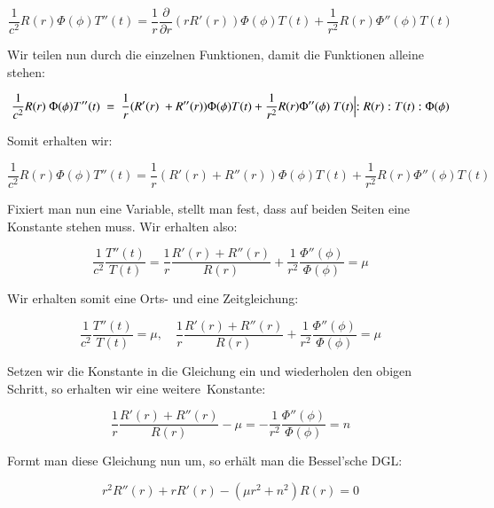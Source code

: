 \begin{equation}
\frac{1}{c^2} R(r) \Phi(\phi) T''(t) = \frac{1}{r} \frac{\partial}{\partial r}(r R'(r)) \Phi(\phi) T(t) + \frac{1}{r^2} R(r) \Phi''(\phi) T(t)
\end{equation}

Wir teilen nun durch die einzelnen Funktionen, damit die Funktionen alleine stehen:

\begin{equation}
\frac{1}{c^2} R(r) \Phi(\phi) T''(t) = \frac{1}{r}(R'(r) + R''(r)) \Phi(\phi) T(t) + \frac{1}{r^2} R(r) \Phi''(\phi) T(t)
\Bigl\lvert
:R(r) : T(t) :\Phi(\phi)
\end{equation}

Somit erhalten wir:

\begin{equation}
\frac{1}{c^2} R(r) \Phi(\phi) T''(t) = \frac{1}{r} (R'(r) + R''(r)) \Phi(\phi) T(t) + \frac{1}{r^2} R(r) \Phi''(\phi) T(t)
\end{equation}

Fixiert man nun eine Variable, stellt man fest, dass auf beiden Seiten eine Konstante stehen muss. Wir erhalten also:

\begin{equation}
\frac{1}{c^2}
\frac{T''(t)}{T(t)} = 
\frac{1}{r} 
\frac{R'(r) + R''(r)}{R(r)} + 
\frac{1}{r^2}
\frac{\Phi''(\phi)}{\Phi(\phi)} = \mu
\end{equation}

Wir erhalten somit eine Orts- und eine Zeitgleichung:

\begin{equation}
\frac{1}{c^2} 
\frac{T''(t)}{T(t)} = 
\mu
,\quad
\frac{1}{r} \frac{R'(r) + R''(r)}{R(r)} + 
\frac{1}{r^2} \frac{\Phi''(\phi)}{\Phi(\phi)} = 
\mu
\end{equation}

Setzen wir die Konstante in die Gleichung ein und wiederholen den obigen Schritt, so erhalten wir eine weitere Konstante:

\begin{equation}
\frac{1}{r} \frac{R'(r) + R''(r)}{R(r)} - \mu =
-\frac{1}{r^2} \frac{\Phi''(\phi)}{\Phi(\phi)} = n
\end{equation}

Formt man diese Gleichung nun um, so erhält man die Bessel'sche DGL:

\begin{equation}
r^2 R''(r) + r R'(r) - (\mu r^2 + n^2)R(r) = 0
\label{eq:besselsche_dgl}
\end{equation}
